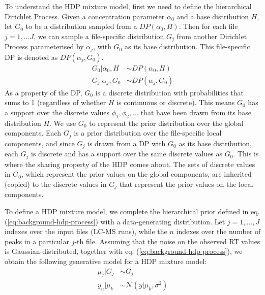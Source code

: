 To understand the HDP mixture model, first we need to define the hierarchical Dirichlet Process. Given a concentration parameter $\alpha_0$ and a base distribution $H$, let $G_0$ to be a distribution sampled from a $DP(\alpha_0, H)$. Then for each file $j=1,...J$, we can sample a file-specific distribution $G_j$ from another Dirichlet Process parameterised by $\alpha_j$, with $G_0$ as its base distribution. This file-specific DP is denoted as $DP(\alpha_j, G_0)$.
\begin{equation}
\begin{aligned}
G_0 \vert \alpha_0, H &\sim DP(\alpha_0, H) \\
G_j \vert \alpha_j, G_0 &\sim DP(\alpha_j, G_0)
\end{aligned}
\label{eq:background-hdp-process}
\end{equation}
As a property of the DP, $G_0$ is a discrete distribution with probabilities that sums to 1 (regardless of whether $H$ is continuous or discrete). This means $G_0$ has a support over the discrete values ${\phi_1, \phi_2, ... }$ that have been drawn from its base distribution $H$. We use $G_0$ to represent the prior distribution over the global components. Each $G_j$ is a prior distribution over the file-specific local components, and since $G_j$ is drawn from a DP with $G_0$ as its base distribution, each $G_j$ is discrete and has a support over the same discrete values as $G_0$. This is where the sharing property of the HDP comes about. The sets of discrete values in $G_0$, which represent the prior values on the global components, are inherited (copied) to the discrete values in $G_j$ that represent the prior values on the local components.

To define a HDP mixture model, we complete the hierarchical prior defined in eq. (\ref{eq:background-hdp-process}) with a data-generating distribution. Let $j=1,...,J$ indexes over the input files (LC-MS runs), while the $n$ indexes over the number of peaks in a particular $j$-th file. Assuming that the noise on the observed RT values is Gaussian-distributed, together with eq. (\ref{eq:background-hdp-process}), we obtain the following generative model for a HDP mixture model:
\begin{equation}
\begin{aligned}
\mu_j \vert G_j            &\sim G_j \\
y_n \vert \mu_k           &\sim \mathcal{N}(y \vert \mu_k, \sigma^2)
\end{aligned}
\label{eq:background-infinite-mixture-hdp}
\end{equation}


